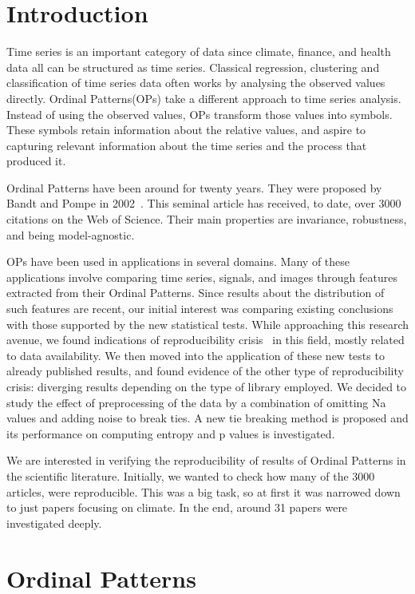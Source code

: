 
\chapter{Introduction}

Time series is an important category of data since climate, finance, and health data all can be structured as time series. Classical regression, clustering and classification of time series data often works by analysing the observed values directly. Ordinal Patterns(OPs) take a different approach to time series analysis.
Instead of using the observed values, OPs transform those values into symbols.
These symbols retain information about the relative values, and aspire to capturing relevant information about the time series and the process that produced it.

Ordinal Patterns have been around for twenty years.
They were proposed by Bandt and Pompe in 2002~\cite{Bandt2002}.
This seminal article has received, to date, over \num{3000} citations on the Web of Science.
Their main properties are invariance, robustness, and being model-agnostic.

OPs have been used in applications in several domains.
Many of these applications involve comparing time series, signals, and images through features extracted from their Ordinal Patterns.
Since results about the distribution of such features are recent, our initial interest was comparing existing conclusions with those supported by the new statistical tests.
While approaching this research avenue, we found indications of reproducibility crisis~\cite{Fidler2018} in this field, mostly related to data availability.
We then moved into the application of these new tests to already published results, and found evidence of the other type of reproducibility crisis: diverging results depending on the type of library employed.
We decided to study the effect of preprocessing of the data by a combination of omitting Na values and adding noise to break ties. A new tie breaking method is proposed and its performance on computing entropy and p values is investigated.

We are interested in verifying the reproducibility of results of Ordinal Patterns in the scientific literature.
Initially, we wanted to check how many of the 3000 articles, were reproducible. This was a big task, so at first it was narrowed down to just papers focusing on climate. In the end, around 31 papers were investigated deeply.

\chapter{Ordinal Patterns}

